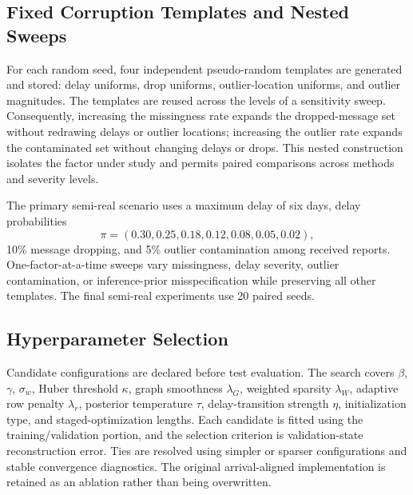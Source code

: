 \subsection{Fixed Corruption Templates and Nested Sweeps}
\label{subsec:fixed_corruption_templates}
For each random seed, four independent pseudo-random templates are generated and stored: delay uniforms, drop uniforms, outlier-location uniforms, and outlier magnitudes. The templates are reused across the levels of a sensitivity sweep. Consequently, increasing the missingness rate expands the dropped-message set without redrawing delays or outlier locations; increasing the outlier rate expands the contaminated set without changing delays or drops. This nested construction isolates the factor under study and permits paired comparisons across methods and severity levels.

The primary semi-real scenario uses a maximum delay of six days, delay probabilities
\begin{equation}
    \pi=(0.30,0.25,0.18,0.12,0.08,0.05,0.02),
    \label{eq:primary_delay_pmf_new}
\end{equation}
10\% message dropping, and 5\% outlier contamination among received reports. One-factor-at-a-time sweeps vary missingness, delay severity, outlier contamination, or inference-prior misspecification while preserving all other templates. The final semi-real experiments use 20 paired seeds.

\subsection{Hyperparameter Selection}
\label{subsec:hyperparameter_selection_new}
Candidate configurations are declared before test evaluation. The search covers $\beta$, $\gamma$, $\sigma_w$, Huber threshold $\kappa$, graph smoothness $\lambda_G$, weighted sparsity $\lambda_W$, adaptive row penalty $\lambda_r$, posterior temperature $\tau$, delay-transition strength $\eta$, initialization type, and staged-optimization lengths. Each candidate is fitted using the training/validation portion, and the selection criterion is validation-state reconstruction error. Ties are resolved using simpler or sparser configurations and stable convergence diagnostics. The original arrival-aligned implementation is retained as an ablation rather than being overwritten.

